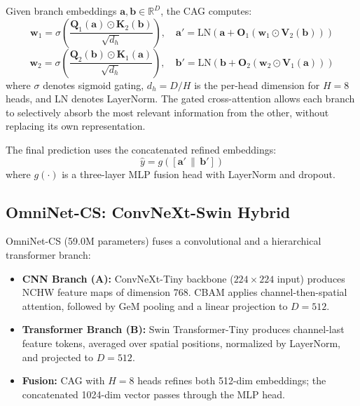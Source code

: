 \documentclass[conference]{IEEEtran}
\begin{document}
Given branch embeddings $\mathbf{a}, \mathbf{b} \in \mathbb{R}^D$, the CAG computes:
\begin{equation}
  \mathbf{w}_1 = \sigma\!\left(\frac{\mathbf{Q}_1(\mathbf{a}) \odot \mathbf{K}_2(\mathbf{b})}{\sqrt{d_h}}\right), \quad
  \mathbf{a}' = \mathrm{LN}\!\left(\mathbf{a} + \mathbf{O}_1(\mathbf{w}_1 \odot \mathbf{V}_2(\mathbf{b}))\right)
\end{equation}
\begin{equation}
  \mathbf{w}_2 = \sigma\!\left(\frac{\mathbf{Q}_2(\mathbf{b}) \odot \mathbf{K}_1(\mathbf{a})}{\sqrt{d_h}}\right), \quad
  \mathbf{b}' = \mathrm{LN}\!\left(\mathbf{b} + \mathbf{O}_2(\mathbf{w}_2 \odot \mathbf{V}_1(\mathbf{a}))\right)
\end{equation}
where $\sigma$ denotes sigmoid gating, $d_h = D/H$ is the per-head dimension for $H = 8$ heads, and LN denotes LayerNorm. The gated cross-attention allows each branch to selectively absorb the most relevant information from the other, without replacing its own representation.

The final prediction uses the concatenated refined embeddings:
\begin{equation}
  \hat{y} = g([\mathbf{a}' \,\|\, \mathbf{b}'])
\end{equation}
where $g(\cdot)$ is a three-layer MLP fusion head with LayerNorm and dropout.

\subsection{OmniNet-CS: ConvNeXt-Swin Hybrid}
OmniNet-CS (59.0M parameters) fuses a convolutional and a hierarchical transformer branch:

\begin{itemize}
    \item \textbf{CNN Branch (A):} ConvNeXt-Tiny backbone ($224\times224$ input) produces NCHW feature maps of dimension 768. CBAM \cite{cbam2018} applies channel-then-spatial attention, followed by GeM pooling \cite{gem2019} and a linear projection to $D=512$.
    \item \textbf{Transformer Branch (B):} Swin Transformer-Tiny \cite{swin2021} produces channel-last feature tokens, averaged over spatial positions, normalized by LayerNorm, and projected to $D=512$.
    \item \textbf{Fusion:} CAG with $H=8$ heads refines both 512-dim embeddings; the concatenated 1024-dim vector passes through the MLP head.
\end{itemize}
\end{document}
